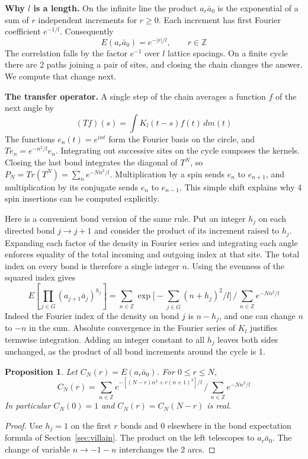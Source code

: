 \documentclass[11pt,a4paper]{article}
\newtheorem{prop}[thm]{Proposition}
\theoremstyle{remark}
\begin{document}
\medskip

\noindent\textbf{Why $l$ is a length.} 
On the infinite line the product $a_r\bar a_0$ is the exponential of a
sum of $r$ independent increments for $r\geq0$. Each increment has first
Fourier coefficient $e^{-1/l}$. Consequently
\[
   E(a_r\bar a_0)=e^{-|r|/l},\qquad r\in\mathbb Z
\]
The correlation falls by the factor $e^{-1}$ over $l$ lattice spacings.
On a finite cycle there are 2 paths joining a pair of sites, and closing
the chain changes the answer. We compute that change next.

\medskip

\noindent\textbf{The transfer operator.} 
A single step of the chain averages a function $f$ of the next angle by
\[
   (Tf)(s)=\int K_l(t-s)f(t)\,dm(t)
\]
The functions $e_n(t)=e^{int}$ form the Fourier basis on the circle, and
$Te_n=e^{-n^2/l}e_n$. Integrating out successive sites on the cycle
composes the kernels. Closing the last bond integrates the diagonal of
$T^N$, so $P_N=Tr(T^N)=\sum_n e^{-Nn^2/l}$.
Multiplication by a spin sends $e_n$ to $e_{n+1}$, and multiplication by
its conjugate sends $e_n$ to $e_{n-1}$. This simple shift explains why
4 spin insertions can be computed explicitly.

Here is a convenient bond version of the same rule. Put an integer $h_j$
on each directed bond $j\to j+1$ and consider the product of its increment
raised to $h_j$. Expanding each factor of the density in Fourier series
and integrating each angle enforces equality of the total incoming and
outgoing index at that site. The total index on every bond is therefore
a single integer $n$. Using the evenness of the squared index gives
\[
 E\left[\prod_{j\in G}(a_{j+1}\bar a_j)^{h_j}\right]
   =\sum_{n\in\mathbb Z}
      \exp\!\biggl[-\sum_{j\in G}(n+h_j)^2/l\biggr]
      \,\Big/\,\sum_{n\in\mathbb Z}e^{-Nn^2/l}
\]
Indeed the Fourier index of the density on bond $j$ is $n-h_j$,
and one can change $n$ to $-n$ in the sum. Absolute convergence in
the Fourier series of $K_l$ justifies termwise integration. Adding an integer
constant to all $h_j$ leaves both sides unchanged, as the product of
all bond increments around the cycle is 1.

\begin{samepage}
\begin{prop}\label{prop:twopoint}
Let $C_N(r)=E(a_r\bar a_0)$. For $0\leq r\leq N$,
\[
 C_N(r)=
 \sum_{n\in\mathbb Z}e^{-[(N-r)n^2+r(n+1)^2]/l}
      \,\Big/\,\sum_{n\in\mathbb Z}e^{-Nn^2/l}
\]
In particular $C_N(0)=1$ and $C_N(r)=C_N(N-r)$ is real.
\end{prop}
\end{samepage}
\begin{proof}
Use $h_j=1$ on the first $r$ bonds and 0 elsewhere in
the bond expectation formula of Section~\ref{sec:villain}. The product on the left telescopes to $a_r\bar a_0$.
The change of variable $n\to-1-n$ interchanges the 2 arcs.
\end{proof}
\end{document}
